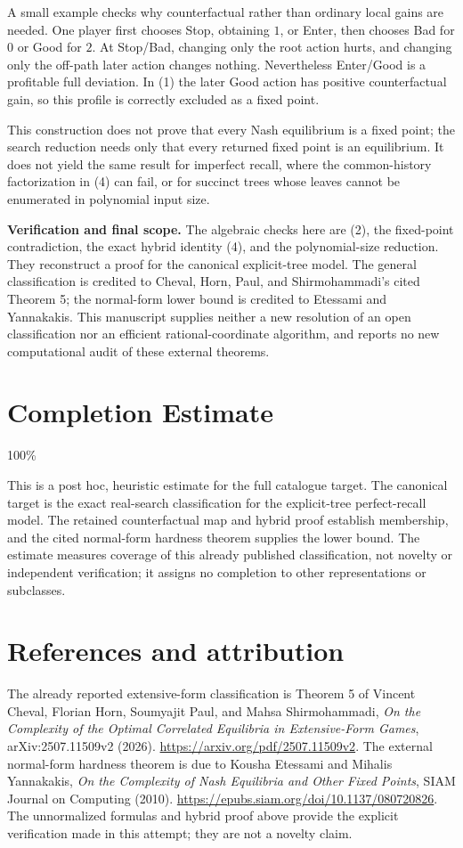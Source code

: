 \documentclass[11pt]{article}
\begin{document}
A small example checks why counterfactual rather than ordinary local
gains are needed. One player first chooses Stop, obtaining $1$, or Enter,
then chooses Bad for $0$ or Good for $2$. At Stop/Bad, changing only the
root action hurts, and changing only the off-path later action changes
nothing. Nevertheless Enter/Good is a profitable full deviation. In (1)
the later Good action has positive counterfactual gain, so this profile
is correctly excluded as a fixed point.

This construction does not prove that every Nash equilibrium is a fixed
point; the search reduction needs only that every returned fixed point
is an equilibrium. It does not yield the same result for imperfect recall,
where the common-history factorization in (4) can fail, or for succinct
trees whose leaves cannot be enumerated in polynomial input size.

\textbf{Verification and final scope.} The algebraic checks here are
(2), the fixed-point contradiction, the exact hybrid identity (4), and
the polynomial-size reduction. They reconstruct a proof for the canonical
explicit-tree model. The general classification is credited to Cheval,
Horn, Paul, and Shirmohammadi's cited Theorem 5; the normal-form lower
bound is credited to Etessami and Yannakakis. This manuscript supplies
neither a new resolution of an open classification nor an efficient
rational-coordinate algorithm, and reports no new computational audit
of these external theorems.

\section{Completion Estimate}
100\%

This is a post hoc, heuristic estimate for the full catalogue target.
The canonical target is the exact real-search classification for the
explicit-tree perfect-recall model. The retained counterfactual map and
hybrid proof establish membership, and the cited normal-form hardness
theorem supplies the lower bound. The estimate measures coverage of this
already published classification, not novelty or independent verification;
it assigns no completion to other representations or subclasses.

\section*{References and attribution}
The already reported extensive-form classification is Theorem 5 of
Vincent Cheval, Florian Horn, Soumyajit Paul, and Mahsa Shirmohammadi,
\emph{On the Complexity of the Optimal Correlated Equilibria in
Extensive-Form Games}, arXiv:2507.11509v2 (2026).
\url{https://arxiv.org/pdf/2507.11509v2}.
The external normal-form hardness theorem is due to Kousha Etessami and
Mihalis Yannakakis, \emph{On the Complexity of Nash Equilibria and Other
Fixed Points}, SIAM Journal on Computing (2010).
\url{https://epubs.siam.org/doi/10.1137/080720826}.
The unnormalized formulas and hybrid proof above provide the explicit
verification made in this attempt; they are not a novelty claim.
\end{document}
